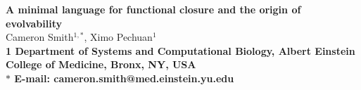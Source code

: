 \begin{flushleft}
{\Large
\textbf{A minimal language for functional closure and the origin of evolvability}
}
\\
Cameron Smith$^{1, \ast}$,
Ximo Pechuan$^{1}$
\\
\bf{1} Department of Systems and Computational Biology, Albert Einstein College of Medicine, Bronx, NY, USA
\\
$\ast$ E-mail: cameron.smith@med.einstein.yu.edu
\end{flushleft}
